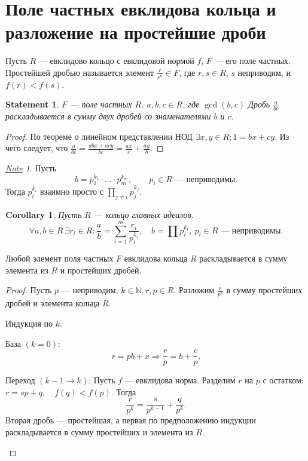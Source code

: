 \documentclass[11pt]{book}
\newcommand{\N}{\mathbb{N}}
\theoremstyle{definition}
\theoremstyle{plain}
\theoremstyle{plain}
\newtheorem{st}{Statement}
\newtheorem{cor}{Corollary}
\theoremstyle{definition}
\theoremstyle{remark}
\newtheorem*{note}{\underline{Note}}
\begin{document}
\section{Поле частных евклидова кольца и разложение на простейшие дроби}
\begin{defn}
    Пусть $ R$ ---  евклидово кольцо с евклидовой нормой $ f$, $ F$ --- его поле частных. {\sf Простейшей дробью} называется элемент $ \frac{r}{s^{n}} \in F$, где $ r, s \in R$, $ s$ неприводим, и  $ f(r) < f(s)$.
\end{defn}
\begin{st}
    $ F$ --- поле частных $ R$. $ a, b, c \in  R$, где $ \gcd(b, c)$
    Дробь $ \frac{a}{bc}$ раскладывается в сумму двух дробей со знаменателями $ b$ и  $ c$.
\end{st}
\begin{proof}
    По теореме о линейном представлении НОД $ \exists x, y \in R: 1 = bx + cy$.
    Из чего следует, что $ \frac{a}{bc} = \frac{abx + acy}{bc} = \frac{ax}{c} + \frac{ay}{b}$.
\end{proof}
\begin{note}
    Пусть
    \[
	b = p_1^{k_1} \cdot  \ldots  \cdot  p_m ^{k_m}, \qquad  p_i \in R \text{ --- неприводимы}
    .\]
    Тогда
    $ p_i^{k_i} $ взаимно просто с $ \prod_{j \ne i} p_j ^{k_j}$.
\end{note}
\begin{cor}
    Пусть $ R$ --- кольцо главных идеалов.
    \[
	\forall a, b \in  R ~ \exists  r_i \in  R: \frac{a}{b} = \sum_{i=1}^{m} \frac{r_i}{p_i^{k_i}}, \quad b = \prod p_i^{k_i}, ~ p_i \in R \text{ --- неприводимы}
    .\]
\end{cor}
\begin{thm}
    Любой элемент поля частных $ F$ евклидова кольца $ R$ раскладывается в сумму элемента из $ R$ и простейших дробей.
\end{thm}
\begin{proof}
    Пусть $ p $ --- неприводим, $ k \in  \N, r, p \in  R $. Разложим $ \frac{r}{p^{k}}$ в сумму простейших дробей и элемента кольца $ R$.

    Индукция по $ k$.
    \begin{description}
	\item База $ (k = 0)$:
	    \[
		r = pb + x \Longrightarrow \frac{r}{p } = b + \frac{c}{p}
	    .\]
	\item
	    Переход $ (k -1 \to  k)$:
	    Пусть $ f$ --- евклидова норма. Разделим  $ r$ на  $ p$ с остатком:
	    $ r = sp + q, \quad f(q) < f(p)$.
	    Тогда
	    \[
		\frac{r}{p^{k}} = \frac{s}{p^{k-1}} + \frac{q}{p^{k}}
	    .\]
	    Вторая дробь --- простейшая, а первая по предположению индукции раскладывается в сумму простейших и элемента из $ R$.
    \end{description}
\end{proof}
\end{document}
